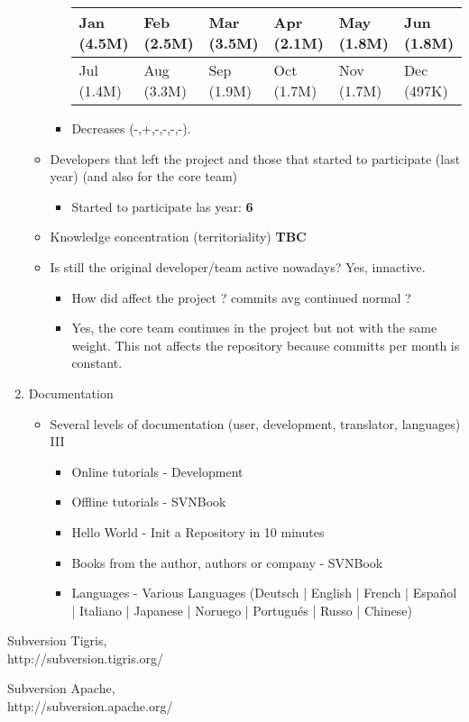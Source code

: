 \documentclass[11pt]{scrartcl}
\begin{document}
\begin{enumerate}
\begin{itemize}
\begin{itemize}
                \begin{tabular}{|l|l|l|l|l|l|}
                    \hline
            	    Jan (4.5M) & Feb (2.5M) & Mar (3.5M) & Apr (2.1M) & May (1.8M) & Jun (1.8M)\\
                    \hline
                    Jul (1.4M) & Aug (3.3M) & Sep (1.9M) & Oct (1.7M) & Nov (1.7M) & Dec (497K)\\
                    \hline
                \end{tabular}
            \item Decreases (-,+,-,-,-,-).
        \end{itemize}
	    \item Developers that left the project and those that started to participate (last year) (and also for the core team)
	    \begin{itemize}
            \item Started to participate las year: \textbf{6}
        \end{itemize}
	    \item Knowledge concentration (territoriality) \textbf{TBC}
	    \item Is still the original developer/team active nowadays? Yes, innactive.
	    \begin{itemize}
            \item How did affect the project ? commits avg continued normal ?
            \item Yes, the core team continues in the project but not with the same weight. This not affects the repository because committs per month is constant.
        \end{itemize}
    \end{itemize}

    \item Documentation
    \begin{itemize}
 	    \item Several levels of documentation (user, development, translator, languages) III
     	    \begin{itemize}
                \item Online tutorials - Development
                \item Offline tutorials - SVNBook
                \item Hello World - Init a Repository in 10 minutes
                \item Books from the author, authors or company - SVNBook
                \item Languages - Various Languages (Deutsch | English | French | Espa\~nol | Italiano | Japanese | Noruego | Portugu\'es | Russo | Chinese)
            \end{itemize}
    \end{itemize}

\end{enumerate}

\begin{thebibliography}{9}

  Subversion Tigris,\\
  http://subversion.tigris.org/

  Subversion Apache,\\
  http://subversion.apache.org/

\end{thebibliography}
\end{document}
